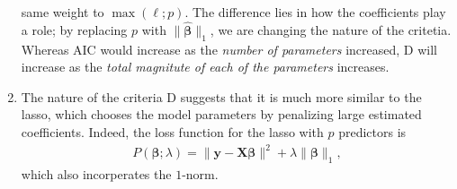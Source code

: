 \documentclass[10pt]{article}
\begin{document}
\begin{enumerate}
    same weight to \(\max(\ell;p)\). The difference lies in how the coefficients play a role; by replacing \(p\) with \(\|\hat{\bm{\beta}}\|_1\), we are changing 
    the nature of the critetia. Whereas AIC would increase as the \textsl{number of parameters} increased, \(\mathrm{D}\) will increase as the 
    \textsl{total magnitute of each of the parameters} increases. 
    \item The nature of the criteria \(\mathrm{D}\) suggests that it is much more similar to the lasso, which chooses the model parameters 
    by penalizing large estimated coefficients. Indeed, the loss function for the lasso with \(p\) predictors is 
    \begin{align*}
        P(\bm{\beta};\lambda)
        = \| \mathbf{y} - \mathbf{X}\bm{\beta} \|^2 + \lambda \| \bm{\beta} \|_1,
    \end{align*}
    which also incorperates the \(1\)-norm. 
\end{enumerate}
\end{document}

